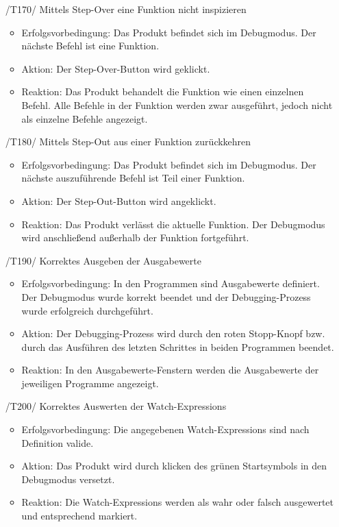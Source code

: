 \documentclass[parskip=full]{scrartcl}
\begin{document}
\begin{itemize}
	\item[/T170/] Mittels \gls{Step-Over} eine Funktion nicht inspizieren
		\begin{itemize}
		\item Erfolgsvorbedingung: Das Produkt befindet sich im Debugmodus. Der nächste Befehl ist eine Funktion.
		\item Aktion: Der Step-Over-Button wird geklickt.
		\item Reaktion:	Das Produkt behandelt die Funktion wie einen einzelnen Befehl. Alle Befehle in der Funktion werden zwar ausgeführt, jedoch nicht als einzelne Befehle angezeigt.
		\end{itemize}	
	
	\item[/T180/] Mittels \gls{Step-Out} aus einer Funktion zurückkehren
		\begin{itemize}
		\item Erfolgsvorbedingung: Das Produkt befindet sich im Debugmodus. Der nächste auszuführende Befehl ist Teil einer Funktion.
		\item Aktion: Der Step-Out-Button wird angeklickt.
		\item Reaktion:	Das Produkt verlässt die aktuelle Funktion. Der Debugmodus wird anschließend außerhalb der Funktion fortgeführt. 	
		\end{itemize}	
	
	\item[/T190/] Korrektes Ausgeben der Ausgabewerte
		\begin{itemize}
		\item Erfolgsvorbedingung: In den Programmen sind Ausgabewerte definiert. Der Debugmodus wurde korrekt beendet und der Debugging-Prozess wurde erfolgreich durchgeführt.
		\item Aktion: Der Debugging-Prozess wird durch den roten Stopp-Knopf bzw. durch das Ausführen des letzten Schrittes in beiden Programmen beendet.
		\item Reaktion:	In den Ausgabewerte-Fenstern werden die Ausgabewerte der jeweiligen Programme angezeigt.	
		\end{itemize}	
	
	\item[/T200/] Korrektes Auswerten der \glspl{Watch-Expression}
		\begin{itemize}
		\item Erfolgsvorbedingung: Die angegebenen Watch-Expressions sind nach Definition valide. 
		\item Aktion: Das Produkt wird durch klicken des grünen Startsymbols in den Debugmodus versetzt. 
		\item Reaktion:	Die Watch-Expressions werden als wahr oder falsch ausgewertet und entsprechend markiert.	
		\end{itemize}	
	

\end{itemize}
\end{document}
